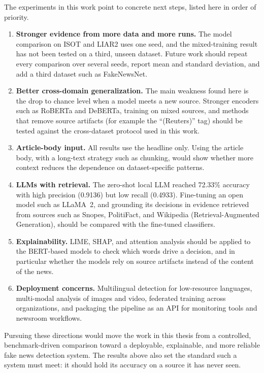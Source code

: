 The experiments in this work point to concrete next steps, listed here in order of priority.

\begin{enumerate}
\item \textbf{Stronger evidence from more data and more runs.} The model comparison on ISOT and LIAR2 uses one seed, and the mixed-training result has not been tested on a third, unseen dataset. Future work should repeat every comparison over several seeds, report mean and standard deviation, and add a third dataset such as FakeNewsNet.
\item \textbf{Better cross-domain generalization.} The main weakness found here is the drop to chance level when a model meets a new source. Stronger encoders such as RoBERTa and DeBERTa, training on mixed sources, and methods that remove source artifacts (for example the ``(Reuters)'' tag) should be tested against the cross-dataset protocol used in this work.
\item \textbf{Article-body input.} All results use the headline only. Using the article body, with a long-text strategy such as chunking, would show whether more context reduces the dependence on dataset-specific patterns.
\item \textbf{LLMs with retrieval.} The zero-shot local LLM reached 72.33\% accuracy with high precision (0.9136) but low recall (0.4933). Fine-tuning an open model such as LLaMA~2, and grounding its decisions in evidence retrieved from sources such as Snopes, PolitiFact, and Wikipedia (Retrieval-Augmented Generation), should be compared with the fine-tuned classifiers.
\item \textbf{Explainability.} LIME, SHAP, and attention analysis should be applied to the BERT-based models to check which words drive a decision, and in particular whether the models rely on source artifacts instead of the content of the news.
\item \textbf{Deployment concerns.} Multilingual detection for low-resource languages, multi-modal analysis of images and video, federated training across organizations, and packaging the pipeline as an API for monitoring tools and newsroom workflows.
\end{enumerate}

Pursuing these directions would move the work in this thesis from a controlled, benchmark-driven comparison toward a deployable, explainable, and more reliable fake news detection system. The results above also set the standard such a system must meet: it should hold its accuracy on a source it has never seen.
